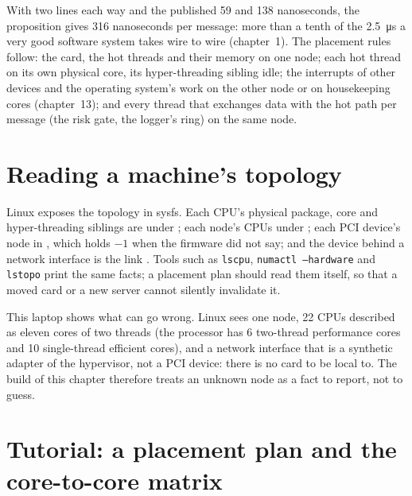 With two lines each way and the published 59 and 138 nanoseconds, the proposition gives 316 nanoseconds per message:
more than a tenth of the \qty{2.5}{\micro\second} a very good software system takes wire to wire (chapter~1). The
placement rules follow: the card, the hot threads and their memory on one node; each hot thread on its own physical core,
its hyper-threading sibling idle; the interrupts of other devices and the operating system's work on the other node or
on housekeeping cores (chapter~13); and every thread that exchanges data with the hot path per message (the risk gate,
the logger's ring) on the same node.

\section{Reading a machine's topology}

Linux exposes the topology in sysfs. Each CPU's physical package, core and hyper-threading siblings are under
; each node's CPUs under ;
each PCI device's node in , which holds $-1$ when the firmware did not say; and
the device behind a network interface is the link . Tools such as
\texttt{lscpu}, \texttt{numactl --hardware} and \texttt{lstopo} print the same facts; a placement plan should read them
itself, so that a moved card or a new server cannot silently invalidate it.

This laptop shows what can go wrong. Linux sees one node, 22 CPUs described as eleven cores of two threads (the processor
has 6 two-thread performance cores and 10 single-thread efficient cores), and a network interface that is a synthetic
adapter of the hypervisor, not a PCI device: there is no card to be local to. The build of this chapter therefore
treats an unknown node as a fact to report, not to guess.

\section{Tutorial: a placement plan and the core-to-core matrix}\label{tut:ll:multi-socket-machines-and-interconnects:tut}

